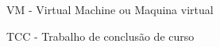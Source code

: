 \begin{siglas}
  \item VM - Virtual Machine ou Maquina virtual
  \item TCC - Trabalho de conclusão de curso
 \end{siglas}
